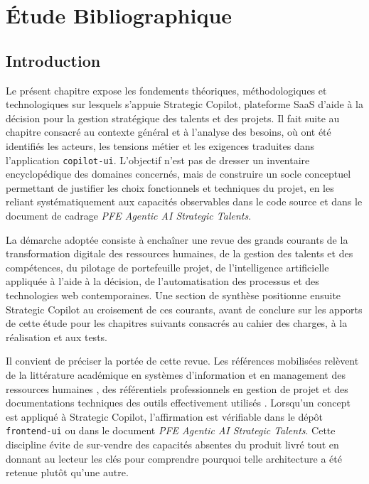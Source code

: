 \chapter{Étude Bibliographique}

\section{Introduction}

Le présent chapitre expose les fondements théoriques, méthodologiques et technologiques sur lesquels s'appuie Strategic Copilot, plateforme SaaS d'aide à la décision pour la gestion stratégique des talents et des projets. Il fait suite au chapitre consacré au contexte général et à l'analyse des besoins, où ont été identifiés les acteurs, les tensions métier et les exigences traduites dans l'application \texttt{copilot-ui}. L'objectif n'est pas de dresser un inventaire encyclopédique des domaines concernés, mais de construire un socle conceptuel permettant de justifier les choix fonctionnels et techniques du projet, en les reliant systématiquement aux capacités observables dans le code source et dans le document de cadrage \emph{PFE Agentic AI Strategic Talents}.

La démarche adoptée consiste à enchaîner une revue des grands courants de la transformation digitale des ressources humaines, de la gestion des talents et des compétences, du pilotage de portefeuille projet, de l'intelligence artificielle appliquée à l'aide à la décision, de l'automatisation des processus et des technologies web contemporaines. Une section de synthèse positionne ensuite Strategic Copilot au croisement de ces courants, avant de conclure sur les apports de cette étude pour les chapitres suivants consacrés au cahier des charges, à la réalisation et aux tests.

Il convient de préciser la portée de cette revue. Les références mobilisées relèvent de la littérature académique en systèmes d'information et en management des ressources humaines \cite{strohmeier2020,marler2013}, des référentiels professionnels en gestion de projet \cite{pmi2021} et des documentations techniques des outils effectivement utilisés \cite{react2024,vite2025,postgresql2025,n8n2025,openai2025}. Lorsqu'un concept est appliqué à Strategic Copilot, l'affirmation est vérifiable dans le dépôt \texttt{frontend-ui} ou dans le document \emph{PFE Agentic AI Strategic Talents}. Cette discipline évite de sur-vendre des capacités absentes du produit livré tout en donnant au lecteur les clés pour comprendre pourquoi telle architecture a été retenue plutôt qu'une autre.

